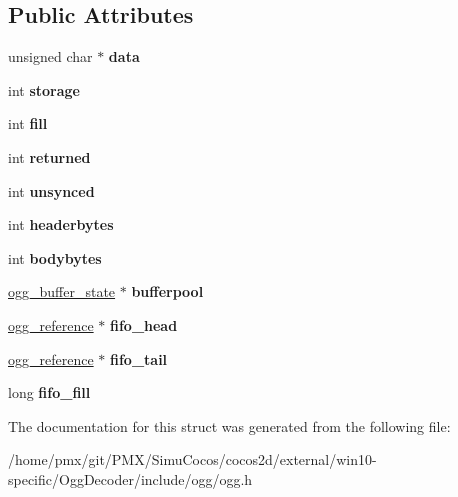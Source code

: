 \subsection*{Public Attributes}
\begin{DoxyCompactItemize}
\item 
\mbox{\label{structogg__sync__state_aa1c21a8d362a6ebf4d0c303bc9fa9be6}} 
unsigned char $\ast$ {\bfseries data}
\item 
\mbox{\label{structogg__sync__state_a15fc1bb5161fc4ae87b7a65982776c24}} 
int {\bfseries storage}
\item 
\mbox{\label{structogg__sync__state_a3afef65cd358eab5827304b8c2360c7f}} 
int {\bfseries fill}
\item 
\mbox{\label{structogg__sync__state_ac1b56ee81f71737f2f6397907f55a2e9}} 
int {\bfseries returned}
\item 
\mbox{\label{structogg__sync__state_a8d538bb32400470f00080e2160158a76}} 
int {\bfseries unsynced}
\item 
\mbox{\label{structogg__sync__state_abb64d78f386bc413527df838f2f681d5}} 
int {\bfseries headerbytes}
\item 
\mbox{\label{structogg__sync__state_aa7ea6e81b751baaa04e4b49cb04e8317}} 
int {\bfseries bodybytes}
\item 
\mbox{\label{structogg__sync__state_accbfdacb8bcefca99e698c28a25c47d8}} 
\hyperlink{structogg__buffer__state}{ogg\+\_\+buffer\+\_\+state} $\ast$ {\bfseries bufferpool}
\item 
\mbox{\label{structogg__sync__state_abafce9ff19a2282ca8c6ff690463f960}} 
\hyperlink{structogg__reference}{ogg\+\_\+reference} $\ast$ {\bfseries fifo\+\_\+head}
\item 
\mbox{\label{structogg__sync__state_a4fdfe9156f7da0eea325fee8ee6c7627}} 
\hyperlink{structogg__reference}{ogg\+\_\+reference} $\ast$ {\bfseries fifo\+\_\+tail}
\item 
\mbox{\label{structogg__sync__state_a35cc94c48000606c145a07fdfe966565}} 
long {\bfseries fifo\+\_\+fill}
\end{DoxyCompactItemize}


The documentation for this struct was generated from the following file\+:\begin{DoxyCompactItemize}
\item 
/home/pmx/git/\+P\+M\+X/\+Simu\+Cocos/cocos2d/external/win10-\/specific/\+Ogg\+Decoder/include/ogg/ogg.\+h\end{DoxyCompactItemize}

